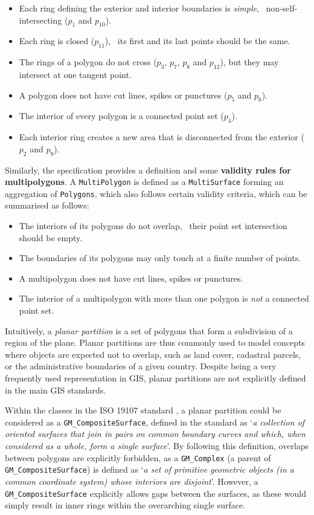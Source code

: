 \begin{itemize}
\item Each ring defining the exterior and interior boundaries is \emph{simple}, \ie\ non-self-intersecting ($p_{1}$ and $p_{10}$).
\item Each ring is closed ($p_{11}$), \ie\ its first and its last points should be the same.
\item The rings of a polygon do not cross ($p_{3}$, $p_{7}$, $p_{8}$ and $p_{12}$), but they may intersect at one tangent point.
\item A polygon does not have cut lines, spikes or punctures ($p_{5}$ and $p_{6}$).
\item The interior of every polygon is a connected point set ($p_{4}$).
\item Each interior ring creates a new area that is disconnected from the exterior ($p_{2}$ and $p_{9}$).
\end{itemize}

Similarly, the specification provides a definition and some \textbf{validity rules for multipolygons}.
A \texttt{MultiPolygon} is defined as a \texttt{MultiSurface} forming an aggregation of \texttt{Polygons}, which also follows certain validity criteria, which can be summarised as follows:

\begin{itemize}
\item The interiors of its polygons do not overlap, \ie\ their point set intersection should be empty.
\item The boundaries of its polygons may only touch at a finite number of points.
\item A multipolygon does not have cut lines, spikes or punctures.
\item The interior of a multipolygon with more than one polygon is \emph{not} a connected point set.
\end{itemize}

Intuitively, a \emph{planar partition} is a set of polygons that form a subdivision of a region of the plane.
Planar partitions are thus commonly used to model concepts where objects are expected not to overlap, such as land cover, cadastral parcels, or the administrative boundaries of a given country.
Despite being a very frequently used representation in GIS, planar partitions are not explicitly defined in the main GIS standards.

Within the classes in the ISO 19107 standard \citep[\S{}6.6]{ISO19107:2005}, a planar partition could be considered as a \texttt{GM\_CompositeSurface}, defined in the standard as `\emph{a collection of oriented surfaces that join in pairs on common boundary curves and which, when considered as a whole, form a single surface}'.
By following this definition, overlaps between polygons are explicitly forbidden, as a \texttt{GM\_Complex} (a parent of \texttt{GM\_CompositeSurface}) is defined as `\emph{a set of primitive geometric objects (in a common coordinate system) whose interiors are disjoint}'.
However, a \texttt{GM\_CompositeSurface} explicitly allows gaps between the surfaces, as these would simply result in inner rings within the overarching single surface.

